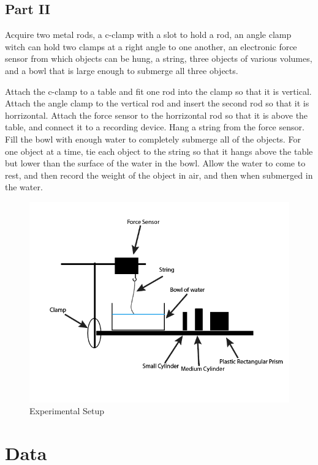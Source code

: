 \documentclass[12pt]{article}
\begin{document}
        \subsection*{Part II}
        Acquire two metal rods, a c-clamp with a slot to hold a rod, an angle clamp witch can hold two clamps at a right angle to one another, an electronic force sensor from which objects can be hung, a string, three objects of various volumes, and a bowl that is large enough to submerge all three objects. 
        
        Attach the c-clamp to a table and fit one rod into the clamp so that it is vertical. Attach the angle clamp to the vertical rod and insert the second rod so that it is horrizontal. Attach the force sensor to the horrizontal rod so that it is above the table, and connect it to a recording device. Hang a string from the force sensor. Fill the bowl with enough water to completely submerge all of the objects. For one object at a time, tie each object to the string so that it hangs above the table but lower than the surface of the water in the bowl. Allow the water to come to rest, and then record the weight of the object in air, and then when submerged in the water.\\
        \begin{figure}[H]
            \centering
            \includegraphics[width=0.75\linewidth]{setup.png}
            \caption{Experimental Setup}
        \end{figure}
    \section{Data}
\end{document}

